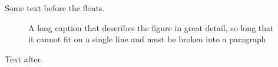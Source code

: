 \documentclass{article}
\begin{document}
Some text before the floats.

\begin{figure}[h]
\centering
\caption{A long caption that describes the figure in great detail, so long that it cannot fit on a single line and must be broken into a paragraph}
\end{figure}

\begin{table}[h]
\caption{Another long caption without centering, describing the table and its columns, with hyphenation of difficult words like typesetting}
\end{table}

Text after.
\end{document}
